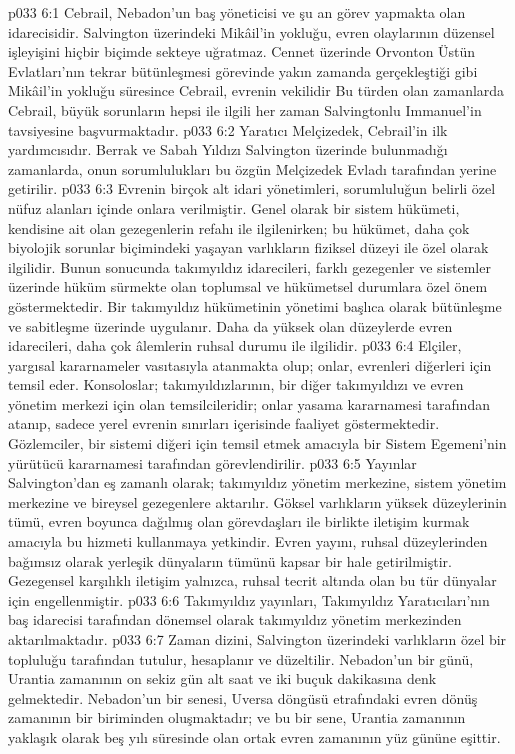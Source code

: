 \vs p033 6:1 Cebrail, Nebadon’un baş yöneticisi ve şu an görev yapmakta olan idarecisidir. Salvington üzerindeki Mikâil’in yokluğu, evren olaylarının düzensel işleyişini hiçbir biçimde sekteye uğratmaz. Cennet üzerinde Orvonton Üstün Evlatları’nın tekrar bütünleşmesi görevinde yakın zamanda gerçekleştiği gibi Mikâil’in yokluğu süresince Cebrail, evrenin vekilidir Bu türden olan zamanlarda Cebrail, büyük sorunların hepsi ile ilgili her zaman Salvingtonlu Immanuel’in tavsiyesine başvurmaktadır.
\vs p033 6:2 Yaratıcı Melçizedek, Cebrail’in ilk yardımcısıdır. Berrak ve Sabah Yıldızı Salvington üzerinde bulunmadığı zamanlarda, onun sorumlulukları bu özgün Melçizedek Evladı tarafından yerine getirilir.
\vs p033 6:3 Evrenin birçok alt idari yönetimleri, sorumluluğun belirli özel nüfuz alanları içinde onlara verilmiştir. Genel olarak bir sistem hükümeti, kendisine ait olan gezegenlerin refahı ile ilgilenirken; bu hükümet, daha çok biyolojik sorunlar biçimindeki yaşayan varlıkların fiziksel düzeyi ile özel olarak ilgilidir. Bunun sonucunda takımyıldız idarecileri, farklı gezegenler ve sistemler üzerinde hüküm sürmekte olan toplumsal ve hükümetsel durumlara özel önem göstermektedir. Bir takımyıldız hükümetinin yönetimi başlıca olarak bütünleşme ve sabitleşme üzerinde uygulanır. Daha da yüksek olan düzeylerde evren idarecileri, daha çok âlemlerin ruhsal durumu ile ilgilidir.
\vs p033 6:4 Elçiler, yargısal kararnameler vasıtasıyla atanmakta olup; onlar, evrenleri diğerleri için temsil eder. Konsoloslar; takımyıldızlarının, bir diğer takımyıldızı ve evren yönetim merkezi için olan temsilcileridir; onlar yasama kararnamesi tarafından atanıp, sadece yerel evrenin sınırları içerisinde faaliyet göstermektedir. Gözlemciler, bir sistemi diğeri için temsil etmek amacıyla bir Sistem Egemeni’nin yürütücü kararnamesi tarafından görevlendirilir.
\vs p033 6:5 Yayınlar Salvington’dan eş zamanlı olarak; takımyıldız yönetim merkezine, sistem yönetim merkezine ve bireysel gezegenlere aktarılır. Göksel varlıkların yüksek düzeylerinin tümü, evren boyunca dağılmış olan görevdaşları ile birlikte iletişim kurmak amacıyla bu hizmeti kullanmaya yetkindir. Evren yayını, ruhsal düzeylerinden bağımsız olarak yerleşik dünyaların tümünü kapsar bir hale getirilmiştir. Gezegensel karşılıklı iletişim yalnızca, ruhsal tecrit altında olan bu tür dünyalar için engellenmiştir.
\vs p033 6:6 Takımyıldız yayınları, Takımyıldız Yaratıcıları’nın baş idarecisi tarafından dönemsel olarak takımyıldız yönetim merkezinden aktarılmaktadır.
\vs p033 6:7 Zaman dizini, Salvington üzerindeki varlıkların özel bir topluluğu tarafından tutulur, hesaplanır ve düzeltilir. Nebadon’un bir günü, Urantia zamanının on sekiz gün alt saat ve iki buçuk dakikasına denk gelmektedir. Nebadon’un bir senesi, Uversa döngüsü etrafındaki evren dönüş zamanının bir biriminden oluşmaktadır; ve bu bir sene, Urantia zamanının yaklaşık olarak beş yılı süresinde olan ortak evren zamanının yüz gününe eşittir.
